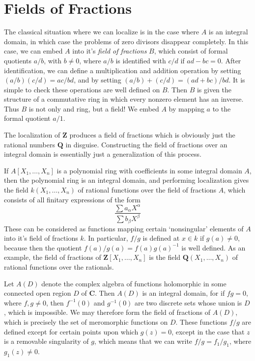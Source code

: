 \section{Fields of Fractions}

The classical situation where we can localize is in the case where $A$ is an integral domain, in which case the problems of zero divisors disappear completely. In this case, we can embed $A$ into it's \emph{field of fractions} $B$, which consist of formal quotients $a/b$, with $b \neq 0$, where $a/b$ is identified with $c/d$ if $ad - bc = 0$. After identification, we can define a multiplication and addition operation by setting $(a/b)(c/d) = ac/bd$, and by setting $(a/b) + (c/d) = (ad + bc)/bd$. It is simple to check these operations are well defined on $B$. Then $B$ is given the structure of a commutative ring in which every nonzero element has an inverse. Thus $B$ is not only and ring, but a field! We embed $A$ by mapping $a$ to the formal quotient $a/1$.

\begin{example}
    The localization of $\mathbf{Z}$ produces a field of fractions which is obviously just the rational numbers $\mathbf{Q}$ in disguise. Constructing the field of fractions over an integral domain is essentially just a generalization of this process.
\end{example}

\begin{example}
    If $A[X_1, \dots, X_n]$ is a polynomial ring with coefficients in some integral domain $A$, then the polynomial ring is an integral domain, and performing localization gives the field $k(X_1, \dots, X_n)$ of rational functions over the field of fractions $A$, which consists of all finitary expressions of the form
    \[ \frac{\sum a_\alpha X^\alpha}{\sum b_\beta X^\beta} \]
    These can be considered as functions mapping certain `nonsingular' elements of $A$ into it's field of fractions $k$. In particular, $f/g$ is defined at $x \in k$ if $g(a) \neq 0$, because then the quotient $f(a)/g(a) = f(a) g(a)^{-1}$ is well defined. As an example, the field of fractions of $\mathbf{Z}[X_1, \dots, X_n]$ is the field $\mathbf{Q}(X_1, \dots, X_n)$ of rational functions over the rationals.
\end{example}

\begin{example}
    Let $A(D)$ denote the complex algebra of functions holomorphic in some connected open region $D$ of $\mathbf{C}$. Then $A(D)$ is an integral domain, for if $fg = 0$, where $f,g \neq 0$, then $f^{-1}(0)$ and $g^{-1}(0)$ are two discrete sets whose union is $D$, which is impossible. We may therefore form the field of fractions of $A(D)$, which is precisely the set of meromorphic functions on $D$. These functions $f/g$ are defined except for certain points upon which $g(z) = 0$, except in the case that $z$ is a removable singularity of $g$, which means that we can write $f/g = f_1/g_1$, where $g_1(z) \neq 0$.
\end{example}

